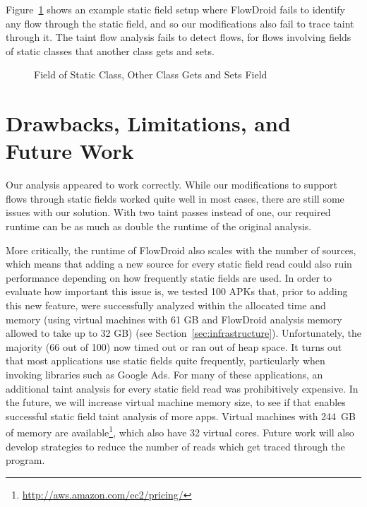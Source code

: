 Figure~\ref{fig:staticAnalysisProblem} shows an example static field setup where FlowDroid fails to identify any flow through the static field, and so our modifications also fail to trace taint through it.  The taint flow analysis fails to detect flows, for flows involving fields of static classes that another class gets and sets.

\begin{figure}
\begin{framed}
\begin{center}
\begin{minipage}{0.85\textwidth}

\end{minipage}
\end{center}
\caption{Field of Static Class, Other Class Gets and Sets Field}
\label{fig:staticAnalysisProblem}
\end{framed}
\end{figure}


\section{Drawbacks, Limitations, and Future Work}

Our analysis appeared to work correctly. While our modifications to support flows through static fields worked quite well in most cases, there are still some issues with our solution. With two taint passes instead of one, our required runtime can be as much as double the runtime of the original analysis. 

More critically, the runtime of FlowDroid also scales with the number of sources, which means that adding a new source for every static field read could also ruin performance depending on how frequently static fields are used. In order to evaluate how important this issue is, we tested 100 APKs that, prior to adding this new feature, were successfully analyzed within the allocated time and memory (using virtual machines with 61 GB and FlowDroid analysis memory allowed to take up to 32 GB) (see Section~\ref{sec:infrastructure}). Unfortunately, the majority (66 out of 100) now timed out or ran out of heap space. It turns out that most applications use static fields quite frequently, particularly when invoking libraries such as Google Ads. For many of these applications, an additional taint analysis for every static field read was prohibitively expensive. In the future, we will increase virtual machine memory size, to see if that enables successful static field taint analysis of more apps. Virtual machines with 244~GB of memory are available\footnote{\url{http://aws.amazon.com/ec2/pricing/}}, which also have 32 virtual cores. Future work will also develop strategies to reduce the number of reads which get traced through the program. 

